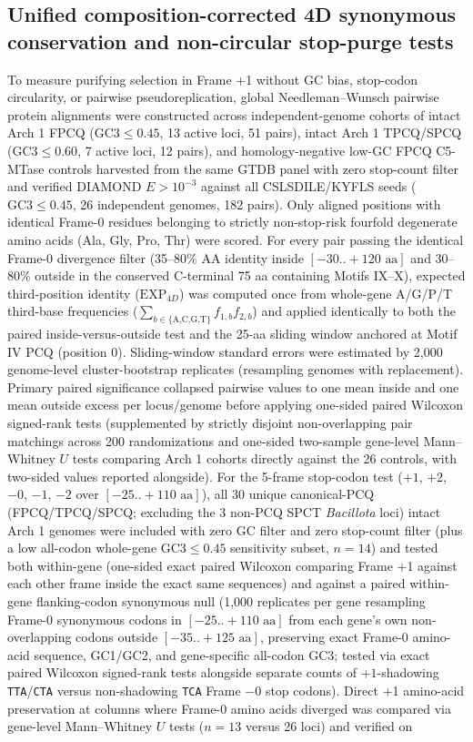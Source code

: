 \documentclass[10pt,letterpaper]{article}
\newcommand{\spname}[1]{\textit{#1}}
\begin{document}
\subsection{Unified composition-corrected 4D synonymous conservation and non-circular stop-purge tests}

To measure purifying selection in Frame +1 without GC bias, stop-codon circularity, or pairwise pseudoreplication, global Needleman--Wunsch pairwise protein alignments were constructed across independent-genome cohorts of intact Arch 1 FPCQ ($\text{GC3} \le 0.45$, 13 active loci, 51 pairs), intact Arch 1 TPCQ/SPCQ ($\text{GC3} \le 0.60$, 7 active loci, 12 pairs), and homology-negative low-GC FPCQ C5-MTase controls harvested from the same GTDB panel with zero stop-count filter and verified DIAMOND $E > 10^{-3}$ against all CSLSDILE/KYFLS seeds ($\text{GC3} \le 0.45$, 26 independent genomes, 182 pairs). Only aligned positions with identical Frame-0 residues belonging to strictly non-stop-risk fourfold degenerate amino acids (Ala, Gly, Pro, Thr) were scored. For every pair passing the identical Frame-0 divergence filter (35--80\% AA identity inside $[-30..+120\text{ aa}]$ and 30--80\% outside in the conserved C-terminal 75 aa containing Motifs IX--X), expected third-position identity ($\text{EXP}_{4D}$) was computed once from whole-gene A/G/P/T third-base frequencies ($\sum_{b \in \{\text{A,C,G,T}\}} f_{1,b} f_{2,b}$) and applied identically to both the paired inside-versus-outside test and the 25-aa sliding window anchored at Motif IV PCQ (position 0). Sliding-window standard errors were estimated by 2,000 genome-level cluster-bootstrap replicates (resampling genomes with replacement). Primary paired significance collapsed pairwise values to one mean inside and one mean outside excess per locus/genome before applying one-sided paired Wilcoxon signed-rank tests (supplemented by strictly disjoint non-overlapping pair matchings across 200 randomizations and one-sided two-sample gene-level Mann--Whitney $U$ tests comparing Arch 1 cohorts directly against the 26 controls, with two-sided values reported alongside). For the 5-frame stop-codon test ($+1$, $+2$, $-0$, $-1$, $-2$ over $[-25..+110\text{ aa}]$), all 30 unique canonical-PCQ (FPCQ/TPCQ/SPCQ; excluding the 3 non-PCQ SPCT \spname{Bacillota} loci) intact Arch 1 genomes were included with zero GC filter and zero stop-count filter (plus a low all-codon whole-gene $\text{GC3} \le 0.45$ sensitivity subset, $n = 14$) and tested both within-gene (one-sided exact paired Wilcoxon comparing Frame +1 against each other frame inside the exact same sequences) and against a paired within-gene flanking-codon synonymous null (1,000 replicates per gene resampling Frame-0 synonymous codons in $[-25..+110\text{ aa}]$ from each gene's own non-overlapping codons outside $[-35..+125\text{ aa}]$, preserving exact Frame-0 amino-acid sequence, GC1/GC2, and gene-specific all-codon GC3; tested via exact paired Wilcoxon signed-rank tests alongside separate counts of $+1$-shadowing \texttt{TTA}/\texttt{CTA} versus non-shadowing \texttt{TCA} Frame $-0$ stop codons). Direct +1 amino-acid preservation at columns where Frame-0 amino acids diverged was compared via gene-level Mann--Whitney $U$ tests ($n = 13$ versus 26 loci) and verified on 
\end{document}
